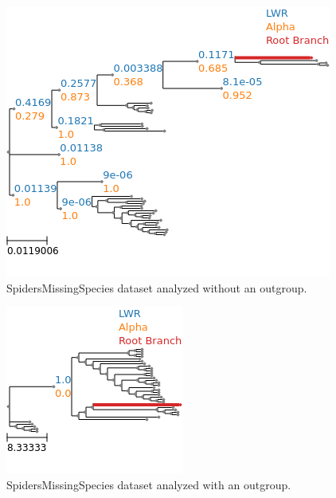 \documentclass{article}
\begin{document}
\begin{figure}
  \begin{center}
    \includegraphics[width=.75\linewidth]{
    ./figs/spiders/missing_species_no_outgroup.png}
    \caption{SpidersMissingSpecies dataset analyzed without an outgroup.}
    \label{fig:spiders-missing-species-no-outgroup}
  \end{center}
\end{figure}

\begin{figure}
  \begin{center}
    \includegraphics[width=.75\linewidth]{
    ./figs/spiders/missing_species_with_outgroup.png}
    \caption{SpidersMissingSpecies dataset analyzed with an outgroup.}
    \label{fig:spiders-missing-species-outgroup}
  \end{center}
\end{figure}
\end{document}
